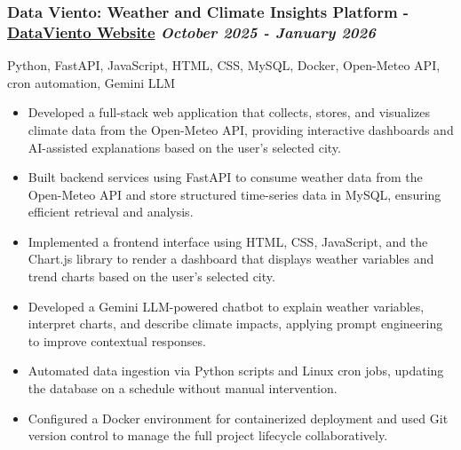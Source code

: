 \documentclass[a4paper,10pt]{article}
\begin{document}
\subsubsection*{%
  \textbf{Data Viento: Weather and Climate Insights Platform} - \href{https://dataviento.voltr.org//}{DataViento Website}
  \hfill
  \textit{October 2025 - January 2026}
}
Python, FastAPI, JavaScript, HTML, CSS, MySQL, Docker, Open-Meteo API, cron automation, Gemini LLM
\begin{itemize}

  \item Developed a full-stack web application that collects, stores, 
        and visualizes climate data from the Open-Meteo API, providing
        interactive dashboards and AI-assisted explanations based on the 
        user's selected city.
  \item Built backend services using FastAPI to consume weather data from
        the Open-Meteo API and store structured time-series data in MySQL,
        ensuring efficient retrieval and analysis.
  \item Implemented a frontend interface using HTML, CSS, JavaScript, and the Chart.js library to render a
        dashboard that displays weather variables and trend charts based on the user's
        selected city.
  \item Developed a Gemini LLM-powered chatbot to explain weather variables, interpret charts,
        and describe climate impacts, applying prompt engineering to
        improve contextual responses.
  \item Automated data ingestion via Python scripts and Linux cron jobs, updating the
        database on a schedule without manual intervention.
  \item Configured a Docker environment for containerized deployment and used Git version control to
        manage the full project lifecycle collaboratively.

\end{itemize}
\end{document}
